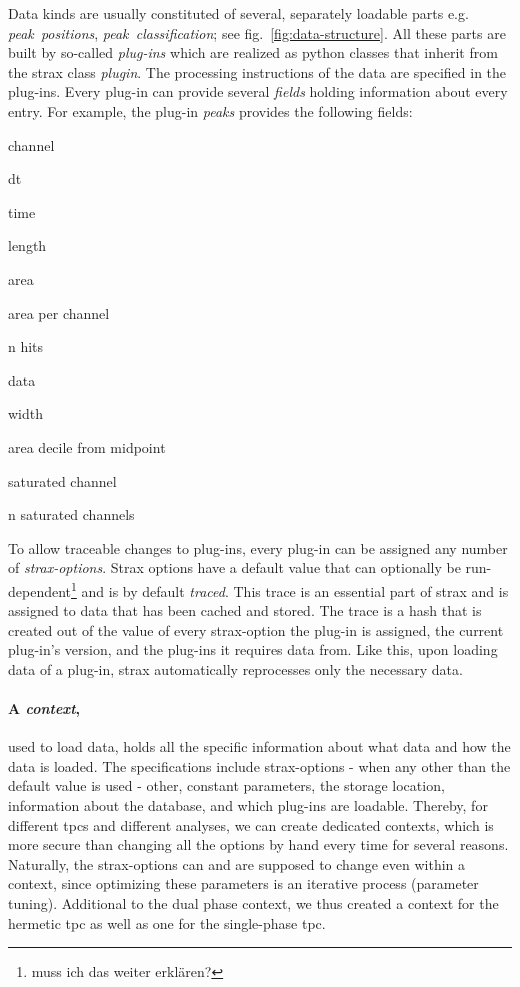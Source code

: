 Data kinds are usually constituted of several, separately loadable parts e.g. \emph{peak~positions}, \emph{peak~classification}; see fig.~\ref{fig:data-structure}.
All these parts are built by so-called \emph{plug-ins} which are realized as python classes that inherit from the strax class \emph{plugin}.
The processing instructions of the data are specified in the plug-ins.
Every plug-in can provide several \emph{fields} holding information about every entry.
For example, the plug-in \emph{peaks} provides the following fields:
\begin{AutoMultiColItemize}
        \item{channel}
        \item{dt}
        \item{time}
        \item{length}
        \item{area}
        \item{area per channel}
        \item{n hits}
        \item{data}
        \item{width}
        \item{area decile from midpoint}
        \item{saturated channel}
        \item{n saturated channels}
\end{AutoMultiColItemize}
To allow traceable changes to plug-ins, every plug-in can be assigned any number of \emph{strax-options}.
Strax options have a default value that can optionally be run-dependent\footnote{muss ich das weiter erklären?} and is by default \emph{traced}.
This trace is an essential part of strax and is assigned to data that has been cached and stored.
The trace is a hash that is created out of the value of every strax-option the plug-in is assigned, the current plug-in's version, and the plug-ins it requires data from.
Like this, upon loading data of a plug-in, strax automatically reprocesses only the necessary data.


\paragraph{A \emph{context},} used to load data, holds all the specific information about what data and how the data is loaded.
The specifications include strax-options - when any other than the default value is used - other, constant parameters, the storage location, information about the database, and which plug-ins are loadable.
Thereby, for different \glspl{tpc} and different analyses, we can create dedicated contexts, which is more secure than changing all the options by hand every time for several reasons.
Naturally, the strax-options can and are supposed to change even within a context, since optimizing these parameters is an iterative process (parameter tuning).
Additional to the dual phase context, we thus created a context for the hermetic \gls{tpc} as well as one for the single-phase \gls{tpc}.

